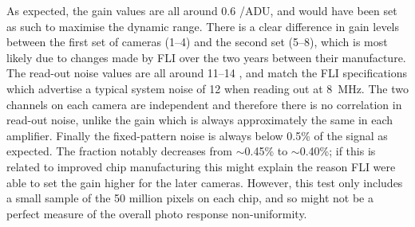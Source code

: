 \begin{colsection}
\begin{colsection}
As expected, the gain values are all around 0.6 \elec/ADU, and would have been set as such to maximise the dynamic range. There is a clear difference in gain levels between the first set of cameras (1--4) and the second set (5--8), which is most likely due to changes made by FLI over the two years between their manufacture. The read-out noise values are all around 11--14 \elec, and match the FLI specifications which advertise a typical system noise of 12 \elec{} when reading out at \SI{8}{\mega\hertz}. The two channels on each camera are independent and therefore there is no correlation in read-out noise, unlike the gain which is always approximately the same in each amplifier. Finally the fixed-pattern noise is always below 0.5\% of the signal as expected. The fraction notably decreases from $\sim$0.45\% to $\sim$0.40\%; if this is related to improved chip manufacturing this might explain the reason FLI were able to set the gain higher for the later cameras. However, this test only includes a small sample of the 50 million pixels on each chip, and so might not be a perfect measure of the overall photo response non-uniformity.


\end{colsection}
\end{colsection}
